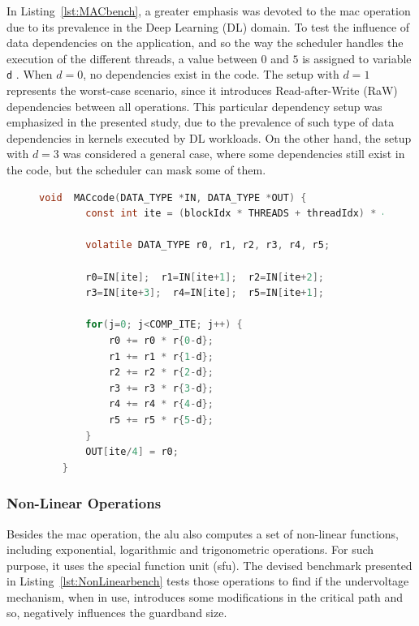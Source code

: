 In Listing~\ref{lst:MACbench}, a greater emphasis was devoted to the \acrshort{mac} operation due to its prevalence in the Deep Learning (DL) domain. To test the influence of data  dependencies on the application, and so the way the scheduler handles the execution of the different threads, a value between $0$ and $5$ is assigned to variable \texttt{d} . When $d=0$, no dependencies exist in the code. The setup with $d=1$ represents the worst-case scenario, since it introduces Read-after-Write (RaW) dependencies between all operations. This particular dependency setup was emphasized in the presented study, due to the prevalence of such type of data dependencies in kernels executed by DL workloads. On the other hand, the setup with $d=3$ was considered a general case, where some dependencies still exist in the code, but the scheduler can mask some of them.



\begin{figure}[htpb]
    \begin{lstlisting}[language=C, caption=MAC Benchmark Code, label=lst:MACbench, basicstyle=\footnotesize\ttfamily, abovecaptionskip=0pt, captionpos=b]
    void  MACcode(DATA_TYPE *IN, DATA_TYPE *OUT) {
        const int ite = (blockIdx * THREADS + threadIdx) * 4;
        
        volatile DATA_TYPE r0, r1, r2, r3, r4, r5;
        
        r0=IN[ite];  r1=IN[ite+1];  r2=IN[ite+2]; 
        r3=IN[ite+3];  r4=IN[ite];  r5=IN[ite+1];
        
        for(j=0; j<COMP_ITE; j++) {
            r0 += r0 * r{0-d};
            r1 += r1 * r{1-d}; 
            r2 += r2 * r{2-d};
            r3 += r3 * r{3-d}; 
            r4 += r4 * r{4-d};
            r5 += r5 * r{5-d};
        }
        OUT[ite/4] = r0;
    }
    \end{lstlisting}
\end{figure}


\subsubsection{Non-Linear Operations}
    
Besides the \acrshort{mac} operation, the \acrshort{alu} also computes a set of non-linear functions, including exponential, logarithmic and trigonometric operations. For such purpose, it uses the special function unit (\acrshort{sfu}). The devised benchmark presented in Listing~\ref{lst:NonLinearbench} tests those operations to find if the undervoltage mechanism, when in use, introduces some modifications in the critical path and so, negatively influences the guardband size.
    
